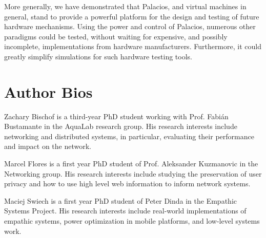 \documentclass{acm_proc_article-sp}
\begin{document}
More generally, we have demonstrated that Palacios, and virtual machines in
general, stand to provide a powerful platform for the design and testing of
future hardware mechanisms. Using the power and control of Palacios, numerous
other paradigms could be tested, without waiting for expensive, and possibly
incomplete, implementations from hardware manufacturers. Furthermore, it could
greatly simplify simulations for such hardware testing tools. 

\section{Author Bios}

Zachary Bischof is a third-year PhD student working with Prof. Fabián
Bustamante in the AquaLab research group. His research interests include
networking and distributed systems, in particular, evaluating their performance
and impact on the network.

Marcel Flores is a first year PhD student of Prof. Aleksander Kuzmanovic in the
Networking group. His research interests include studying the preservation of
user privacy and how to use high level web information to inform network
systems.

Maciej Swiech is a first year PhD student of Peter Dinda in the Empathic
Systems Project. His research interests include real-world implementations of
empathic systems, power optimization in mobile platforms, and low-level systems
work.


\end{document}
